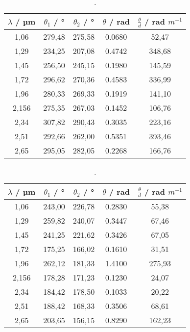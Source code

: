 \begin{table}[h]
  \centering
  \caption{.}
  \label{tab:probe2}
  \begin{tabular}{S[table-format=1.1] S S S S}
    {$\lambda$ / µm} & {$\theta_1$ / °} & {$\theta_2$ / °} & {$\theta$ / rad} & {$\frac{\theta}{d}$ / rad $m^{-1}$}\\
    ,06 &  279,48 &  275,58 & 0.0680 & 52,47\\
    1,29 &  234,25 &  207,08 & 0.4742 & 348,68\\
    1,45 &  256,50 &  245,15 & 0.1980 & 145,59\\
    1,72 &  296,62 &  270,36 & 0.4583 & 336,99\\
    1,96 &  280,33 &  269,33 & 0.1919 & 141,10\\
    2,156 & 275,35 &  267,03 & 0.1452 & 106,76\\
    2,34 & 307,82 &  290,43 & 0.3035 & 223,16\\
    2,51 & 292,66 &  262,00 & 0.5351 & 393,46\\
    2,65 & 295,05 &  282,05 & 0.2268 & 166,76\\
  \end{tabular}
\end{table}

\begin{table}[h]
  \centering
  \caption{.}
  \label{tab:probe3}
  \begin{tabular}{S[table-format=1.1] S S S S}
    {$\lambda$ / µm} & {$\theta_1$ / °} & {$\theta_2$ / °} & {$\theta$ / rad} & {$\frac{\theta}{d}$ / rad $m^{-1}$}\\
    ,06 &  243,00 &  226,78 & 0.2830 & 55,38\\
    1,29 &  259,82 &  240,07 & 0.3447 & 67,46\\
    1,45 &  241,25 &  221,62 & 0.3426 & 67,05\\
    1,72 &  175,25 &  166,02 & 0.1610 & 31,51\\
    1,96 &  262,12 &  181,33 & 1.4100 & 275,93\\
    2,156 & 178,28 &  171,23 & 0.1230 & 24,07\\
    2,34 & 184,42 &  178,50 & 0.1033 & 20,22\\
    2,51 & 188,42 &  168,33 & 0.3506 & 68,61\\
    2,65 & 203,65 &  156,15 & 0.8290 & 162,23\\
  \end{tabular}
\end{table}
